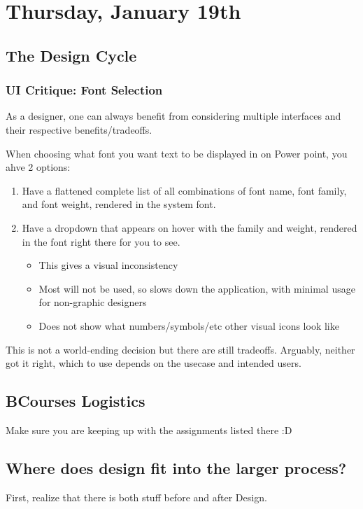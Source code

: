 \section{Thursday, January 19th}
\subsection{The Design Cycle}

\subsubsection{UI Critique: Font Selection}
As a designer, one can always benefit from considering multiple interfaces and their respective benefits/tradeoffs.

When choosing what font you want text to be displayed in on Power point, you ahve 2 options:

\begin{enumerate}
    \item Have a flattened complete list of all combinations of font name, font family, and font weight, rendered in the system font.
    \item Have a dropdown that appears on hover with the family and weight, rendered in the font right there for you to see.
    \begin{itemize}
        \item This gives a visual inconsistency
        \item Most will not be used, so slows down the application, with minimal usage for non-graphic designers
        \item Does not show what numbers/symbols/etc other visual icons look like
    \end{itemize}
\end{enumerate}
This is not a world-ending decision but there are still tradeoffs. Arguably, neither got it right, which to use depends on the usecase and intended users.

\subsection{BCourses Logistics}
Make sure you are keeping up with the assignments listed there :D

\subsection{Where does design fit into the larger process?}
First, realize that there is both stuff before and after Design.

